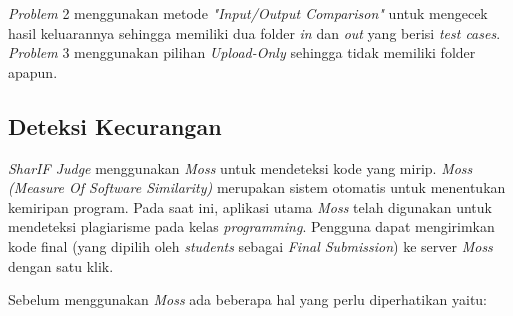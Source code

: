 \textit{Problem} 2 menggunakan metode \textit{"Input/Output Comparison"} untuk mengecek hasil keluarannya sehingga memiliki dua folder \textit{in} dan \textit{out} yang berisi \textit{test cases}. \textit{Problem} 3 menggunakan pilihan \textit{Upload-Only} sehingga tidak memiliki folder apapun.

\subsection{Deteksi Kecurangan}
\label{sec:deteksi_kecurangan}
\textit{SharIF Judge} menggunakan \textit{Moss} untuk mendeteksi kode yang mirip. \textit{Moss (Measure Of Software Similarity)} merupakan sistem otomatis untuk menentukan kemiripan program. Pada saat ini, aplikasi utama \textit{Moss} telah digunakan untuk mendeteksi plagiarisme pada kelas \textit{programming}. Pengguna dapat mengirimkan kode final (yang dipilih oleh \textit{students} sebagai \textit{Final Submission}) ke server \textit{Moss} dengan satu klik.

Sebelum menggunakan \textit{Moss} ada beberapa hal yang perlu diperhatikan yaitu:

